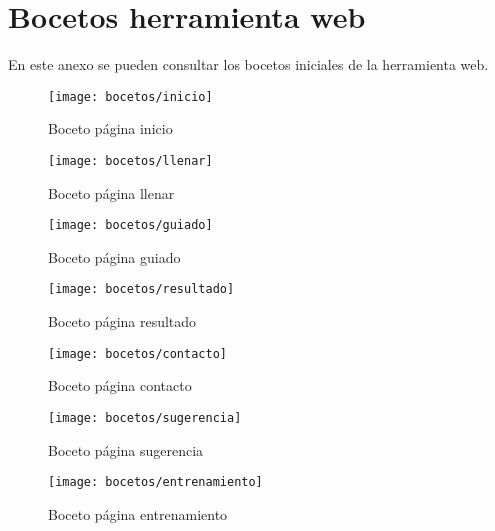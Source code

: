 \chapter{Bocetos herramienta web}
\label{cap:Bocetos}

En este anexo se pueden consultar los bocetos iniciales de la herramienta web.

\begin{figure}[htb]
  \centering
    \texttt{[image: bocetos/inicio]}
  \caption[Boceto página inicio]{Boceto página inicio}
  \label{fig:Boceto página inicio anexo}
\end{figure}

\begin{figure}[htb]
  \centering
    \texttt{[image: bocetos/llenar]}
  \caption[Boceto página llenar]{Boceto página llenar}
  \label{fig:Boceto página llenar anexo}
\end{figure}

\begin{figure}[htb]
  \centering
    \texttt{[image: bocetos/guiado]}
  \caption[Boceto página guiado]{Boceto página guiado}
  \label{fig:Boceto página guiado anexo}
\end{figure}

\begin{figure}[htb]
  \centering
    \texttt{[image: bocetos/resultado]}
  \caption[Boceto página resultado]{Boceto página resultado}
  \label{fig:Boceto página resultado anexo}
\end{figure}

\begin{figure}[htb]
  \centering
    \texttt{[image: bocetos/contacto]}
  \caption[Boceto página contacto]{Boceto página contacto}
  \label{fig:Boceto página contacto anexo}
\end{figure}

\begin{figure}[htb]
  \centering
    \texttt{[image: bocetos/sugerencia]}
  \caption[Boceto página sugerencia]{Boceto página sugerencia}
  \label{fig:Boceto página llenar anexo}
\end{figure}

\begin{figure}[htb]
  \centering
    \texttt{[image: bocetos/entrenamiento]}
  \caption[Boceto página entrenamiento]{Boceto página entrenamiento}
  \label{fig:Boceto página entrenamiento anexo}
\end{figure}
